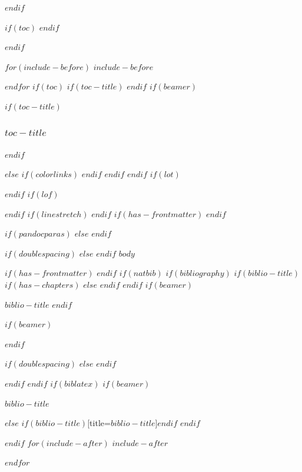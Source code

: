 \documentclass[
$if(fontsize)$
  $fontsize$,
$endif$
$if(lang)$
  $babel-lang$,
$endif$
$if(papersize)$
  $papersize$paper,
$endif$
$if(beamer)$
  ignorenonframetext,
$if(handout)$
  handout,
$endif$
$if(aspectratio)$
  aspectratio=$aspectratio$,
$endif$
$endif$
$for(classoption)$
  $classoption$$sep$,
$endfor$
]{$documentclass$}
\newif\ifbibliography
\begin{document}
$endif$

\vskip -8.5pt

$if(toc)$
{
\hypersetup{linkcolor=black}
\setcounter{tocdepth}{$toc-depth$}
\tableofcontents
}
$endif$

$endif$ %

$for(include-before)$
$include-before$

$endfor$
$if(toc)$
$if(toc-title)$
\renewcommand*\contentsname{$toc-title$}
$endif$
$if(beamer)$
\begin{frame}[allowframebreaks]
$if(toc-title)$
  \frametitle{$toc-title$}
$endif$
  \tableofcontents[hideallsubsections]
\end{frame}
$else$
{
$if(colorlinks)$
\hypersetup{linkcolor=$if(toccolor)$$toccolor$$else$$endif$}
$endif$
\setcounter{tocdepth}{$toc-depth$}
\tableofcontents
}
$endif$
$endif$
$if(lot)$
\listoftables
$endif$
$if(lof)$
\listoffigures
$endif$
$if(linestretch)$
$endif$
$if(has-frontmatter)$
\mainmatter
$endif$

$if(pandocparas)$
$else$
\setlength{\parindent}{16pt}
\setlength{\parskip}{0pt}
$endif$

$if(doublespacing)$
\doublespacing
$else$
$endif$
$body$

$if(has-frontmatter)$
\backmatter
$endif$
$if(natbib)$
$if(bibliography)$
$if(biblio-title)$
$if(has-chapters)$
\renewcommand\bibname{$biblio-title$}
$else$
\renewcommand\refname{$biblio-title$}
$endif$
$endif$
$if(beamer)$
\begin{frame}[allowframebreaks]{$biblio-title$}
  \bibliographytrue
$endif$
  
$if(beamer)$
\end{frame}
$endif$


$if(doublespacing)$
\singlespacing
$else$
$endif$

$endif$
$endif$
$if(biblatex)$
$if(beamer)$
\begin{frame}[allowframebreaks]{$biblio-title$}
  \bibliographytrue
  \printbibliography[heading=none]
\end{frame}
$else$
\printbibliography$if(biblio-title)$[title=$biblio-title$]$endif$
$endif$

$endif$
$for(include-after)$
$include-after$

$endfor$
\end{document}
